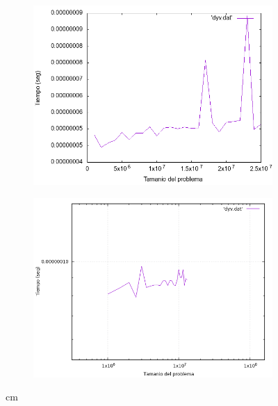 \documentclass[12pt,spanish]{article}
\begin{document}
\begin{figure}[H]
\centering
\begin{subfigure}[b]{0.48\textwidth}
\includegraphics[width=\textwidth]{dyv.png}
\end{subfigure}
\quad
\begin{subfigure}[b]{0.48\textwidth}
\includegraphics[width=\textwidth]{dyv_zoom.png}
\end{subfigure}
 cm


\end{figure}
\end{document}
